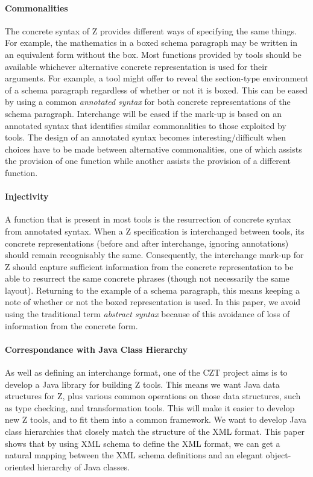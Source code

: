 \documentclass{llncs}  %
\begin{document}
\paragraph{Commonalities}
The concrete syntax of Z provides different ways of specifying the same things.
For example, the mathematics in a boxed schema paragraph
may be written in an equivalent form without the box.
Most functions provided by tools should be available
whichever alternative concrete representation is used for their arguments.
For example, a tool might offer to reveal the section-type environment
of a schema paragraph regardless of whether or not it is boxed.
This can be eased by using a common \textit{annotated syntax}
for both concrete representations of the schema paragraph.
Interchange will be eased if the mark-up is based on an annotated syntax
that identifies similar commonalities to those exploited by tools.
The design of an annotated syntax becomes interesting/difficult
when choices have to be made between alternative commonalities,
one of which assists the provision of one function
while another assists the provision of a different function.

\paragraph{Injectivity}
A function that is present in most tools
is the resurrection of concrete syntax from annotated syntax.
When a Z specification is interchanged between tools,
its concrete representations
(before and after interchange, ignoring annotations)
should remain recognisably the same.
Consequently, the interchange mark-up for Z should capture
sufficient information from the concrete representation 
to be able to resurrect the same concrete phrases
(though not necessarily the same layout).
Returning to the example of a schema paragraph,
this means keeping a note of whether or not the boxed representation is used.
In this paper, we avoid using the traditional term \textit{abstract syntax}
because of this avoidance of loss of information from the concrete form.

\paragraph{Correspondance with Java Class Hierarchy}
As well as defining an interchange format, one of the CZT project
aims is to develop a Java library for building Z tools.  
This means we want Java data structures for Z, plus various
common operations on those data structures, such as type checking,
and transformation tools.  This will make it easier to develop new
Z tools, and to fit them into a common framework.
We want to develop Java class hierarchies
that closely match the structure of the XML format.  
This paper shows that by using XML schema to define the XML format,
we can get a natural mapping between the XML schema definitions and
an elegant object-oriented hierarchy of Java classes.
\end{document}
